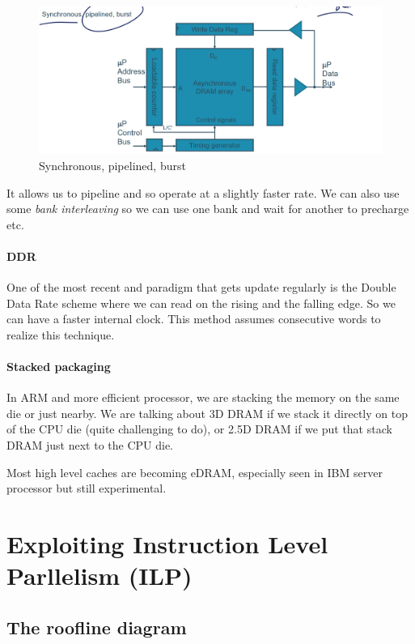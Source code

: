 \documentclass{report}
\begin{document}
\begin{figure}[H]
    \centering
    \includegraphics[width=0.75\linewidth]{SDRAM.png}
    \caption{Synchronous, pipelined, burst}
    \label{fig:SDRAM-label}
\end{figure}

It allows us to pipeline and so operate at a slightly faster rate. We can also use some \textit{bank interleaving} so we can use one bank and wait for another to precharge etc.

\subsubsection{DDR}

One of the most recent and paradigm that gets update regularly is the Double Data Rate scheme where we can read on the rising and the falling edge. So we can have a faster internal clock. This method assumes consecutive words to realize this technique.

\subsubsection{Stacked packaging}

In ARM and more efficient processor, we are stacking the memory on the same die or just nearby. We are talking about 3D DRAM if we stack it directly on top of the CPU die (quite challenging to do), or 2.5D DRAM if we put that stack DRAM just next to the CPU die.

Most high level caches are becoming eDRAM, especially seen in IBM server processor but still experimental.

\chapter{Exploiting Instruction Level Parllelism (ILP)}
\label{part-3}

\section{The roofline diagram}
\end{document}
